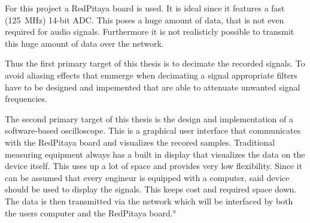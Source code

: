 For this project  a RedPitaya board is  used. It is ideal since  it features a
fast (\SI{125}{\mega\hertz})  14-bit ADC. This  poses a  huge amount  of data,
that is not even required for audio signals. Furthermore it is not realisticly
possible to transmit this huge amount of data over the network.

Thus  the first  primary target  of this  thesis is  to decimate  the recorded
signals. To  avoid aliasing  effects  that emmerge  when  decimating a  signal
appropriate  filters have  to  be designed  and impemented  that  are able  to
attenuate unwanted signal frequencies.

The second primary  target of this thesis is the  design and implementation of
a  software-based  oscilloscope. This  is  a  graphical  user  interface  that
communicates  with the  RedPitaya board  and visualizes  the recored  samples.
Traditional measuring equipment always has  a built in display that visualizes
the data on the  device itself. This uses up a lot of  space and provides very
low flexibility.  Since it can be assumed that every engineur is equipped with
a computer, said device should be used to display the signals. This keeps cost
and required space  down.  The data is then transmitted  via the network which
will be interfaced by both the users computer and the RedPitaya board.°

\cite{1163535}

